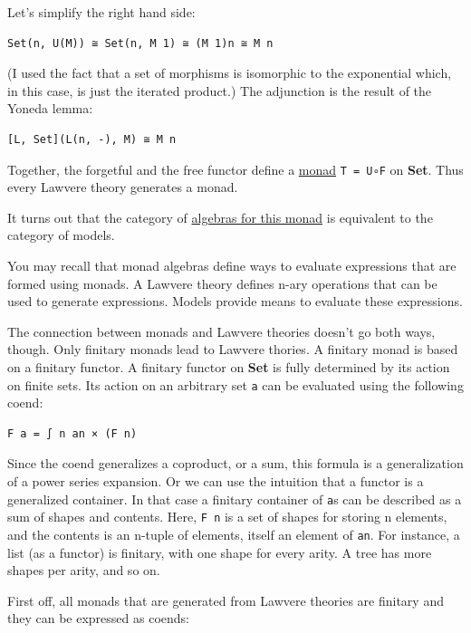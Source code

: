 Let's simplify the right hand side:

\begin{verbatim}
Set(n, U(M)) ≅ Set(n, M 1) ≅ (M 1)n ≅ M n
\end{verbatim}

(I used the fact that a set of morphisms is isomorphic to the
exponential which, in this case, is just the iterated product.) The
adjunction is the result of the Yoneda lemma:

\begin{verbatim}
[L, Set](L(n, -), M) ≅ M n
\end{verbatim}

Together, the forgetful and the free functor define a
\href{https://bartoszmilewski.com/2016/12/27/monads-categorically/}{monad}
\texttt{T\ =\ U∘F} on \textbf{Set}. Thus every Lawvere theory generates
a monad.

It turns out that the category of
\href{https://bartoszmilewski.com/2017/03/14/algebras-for-monads/}{algebras
for this monad} is equivalent to the category of models.

You may recall that monad algebras define ways to evaluate expressions
that are formed using monads. A Lawvere theory defines n-ary operations
that can be used to generate expressions. Models provide means to
evaluate these expressions.

The connection between monads and Lawvere theories doesn't go both ways,
though. Only finitary monads lead to Lawvere thories. A finitary monad
is based on a finitary functor. A finitary functor on \textbf{Set} is
fully determined by its action on finite sets. Its action on an
arbitrary set \texttt{a} can be evaluated using the following coend:

\begin{verbatim}
F a = ∫ n an × (F n)
\end{verbatim}

Since the coend generalizes a coproduct, or a sum, this formula is a
generalization of a power series expansion. Or we can use the intuition
that a functor is a generalized container. In that case a finitary
container of \texttt{a}s can be described as a sum of shapes and
contents. Here, \texttt{F\ n} is a set of shapes for storing n elements,
and the contents is an n-tuple of elements, itself an element of
\texttt{an}. For instance, a list (as a functor) is finitary, with one
shape for every arity. A tree has more shapes per arity, and so on.

First off, all monads that are generated from Lawvere theories are
finitary and they can be expressed as coends:

